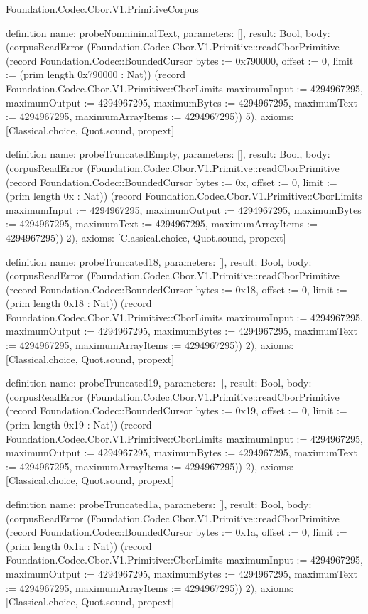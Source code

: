 \begin{lexlean}{Foundation.Codec.Cbor.V1.PrimitiveCorpus}
\begin{semanticmodule}
definition{
  name: probeNonminimalText,
  parameters: [],
  result: Bool,
  body: (corpusReadError (Foundation.Codec.Cbor.V1.Primitive::readCborPrimitive (record Foundation.Codec::BoundedCursor {bytes := 0x790000, offset := 0, limit := (prim length 0x790000 : Nat)}) (record Foundation.Codec.Cbor.V1.Primitive::CborLimits {maximumInput := 4294967295, maximumOutput := 4294967295, maximumBytes := 4294967295, maximumText := 4294967295, maximumArrayItems := 4294967295})) 5),
  axioms: [Classical.choice, Quot.sound, propext]
}

definition{
  name: probeTruncatedEmpty,
  parameters: [],
  result: Bool,
  body: (corpusReadError (Foundation.Codec.Cbor.V1.Primitive::readCborPrimitive (record Foundation.Codec::BoundedCursor {bytes := 0x, offset := 0, limit := (prim length 0x : Nat)}) (record Foundation.Codec.Cbor.V1.Primitive::CborLimits {maximumInput := 4294967295, maximumOutput := 4294967295, maximumBytes := 4294967295, maximumText := 4294967295, maximumArrayItems := 4294967295})) 2),
  axioms: [Classical.choice, Quot.sound, propext]
}

definition{
  name: probeTruncated18,
  parameters: [],
  result: Bool,
  body: (corpusReadError (Foundation.Codec.Cbor.V1.Primitive::readCborPrimitive (record Foundation.Codec::BoundedCursor {bytes := 0x18, offset := 0, limit := (prim length 0x18 : Nat)}) (record Foundation.Codec.Cbor.V1.Primitive::CborLimits {maximumInput := 4294967295, maximumOutput := 4294967295, maximumBytes := 4294967295, maximumText := 4294967295, maximumArrayItems := 4294967295})) 2),
  axioms: [Classical.choice, Quot.sound, propext]
}

definition{
  name: probeTruncated19,
  parameters: [],
  result: Bool,
  body: (corpusReadError (Foundation.Codec.Cbor.V1.Primitive::readCborPrimitive (record Foundation.Codec::BoundedCursor {bytes := 0x19, offset := 0, limit := (prim length 0x19 : Nat)}) (record Foundation.Codec.Cbor.V1.Primitive::CborLimits {maximumInput := 4294967295, maximumOutput := 4294967295, maximumBytes := 4294967295, maximumText := 4294967295, maximumArrayItems := 4294967295})) 2),
  axioms: [Classical.choice, Quot.sound, propext]
}

definition{
  name: probeTruncated1a,
  parameters: [],
  result: Bool,
  body: (corpusReadError (Foundation.Codec.Cbor.V1.Primitive::readCborPrimitive (record Foundation.Codec::BoundedCursor {bytes := 0x1a, offset := 0, limit := (prim length 0x1a : Nat)}) (record Foundation.Codec.Cbor.V1.Primitive::CborLimits {maximumInput := 4294967295, maximumOutput := 4294967295, maximumBytes := 4294967295, maximumText := 4294967295, maximumArrayItems := 4294967295})) 2),
  axioms: [Classical.choice, Quot.sound, propext]
}


\end{semanticmodule}
\end{lexlean}
